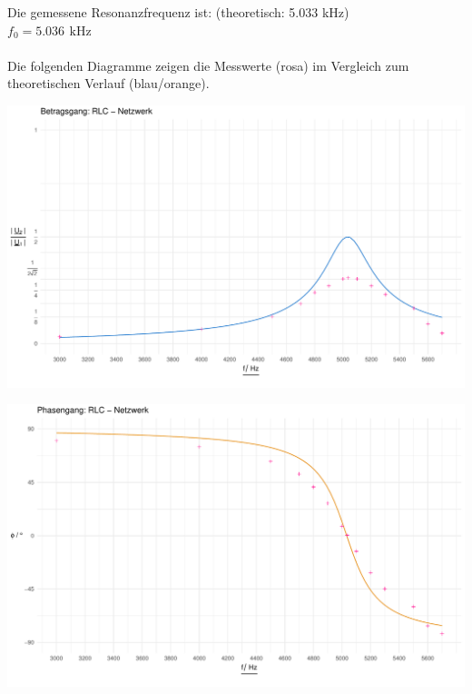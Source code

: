 \documentclass[a4paper, 12pt]{article}
\begin{document}
    \noindent Die gemessene Resonanzfrequenz ist: (theoretisch: 5.033 kHz)\\
    $f_0 = 5.036 \,\ \si{\kilo\hertz}$\\\\


    \noindent Die folgenden Diagramme zeigen die Messwerte (rosa) im Vergleich zum theoretischen Verlauf (blau/orange).\\

    \begin{center}
      \includegraphics[scale=0.5]{./R/2_7/2_7_betrag.pdf}
    \end{center}

    \begin{center}
      \includegraphics[scale=0.5]{./R/2_7/2_7_phase.pdf}
    \end{center}
\end{document}
